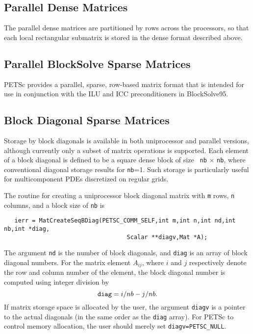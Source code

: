 \subsection{Parallel Dense Matrices}

The parallel dense matrices are partitioned by rows across the
processors, so that each local rectangular submatrix is stored in the
dense format described above.

\subsection{Parallel BlockSolve Sparse Matrices}

PETSc provides a parallel, sparse, row-based matrix format that is
intended for use in conjunction with the ILU and ICC preconditioners
in BlockSolve95.  

\subsection{Block Diagonal Sparse Matrices}
\label{sec:bdiag}

Storage  by block diagonals is
available in both uniprocessor and parallel versions, although currently
only a subset of matrix operations is supported.  Each element of
a block diagonal is defined to be a square dense block of size {\tt
nb} $\times$ {\tt nb}, where conventional diagonal storage results for
{\tt nb}=1.  Such storage is particularly useful for multicomponent PDEs
discretized on regular grids.

The routine for creating a uniprocessor block diagonal matrix with {\tt m} 
rows, {\tt n} columns, and a block size of {\tt nb} is
\begin{verbatim}
   ierr = MatCreateSeqBDiag(PETSC_COMM_SELF,int m,int n,int nd,int nb,int *diag,
                                   Scalar **diagv,Mat *A);
\end{verbatim}
The  argument {\tt nd} is the number of 
block diagonals, and {\tt diag} is
an array of block diagonal numbers.  For the matrix element $A_{ij}$,
where $i$ and $j$ respectively denote the row and column number of the 
element, the block diagonal number is computed using integer division by
\[ {\tt diag} = i/nb - j/nb. \]
If matrix storage space is allocated by the user, the argument {\tt diagv} 
is a pointer to the actual diagonals (in the same order as the {\tt diag} 
array).  For PETSc to control memory allocation, the user should merely
set {\tt diagv=PETSC\_NULL}.

